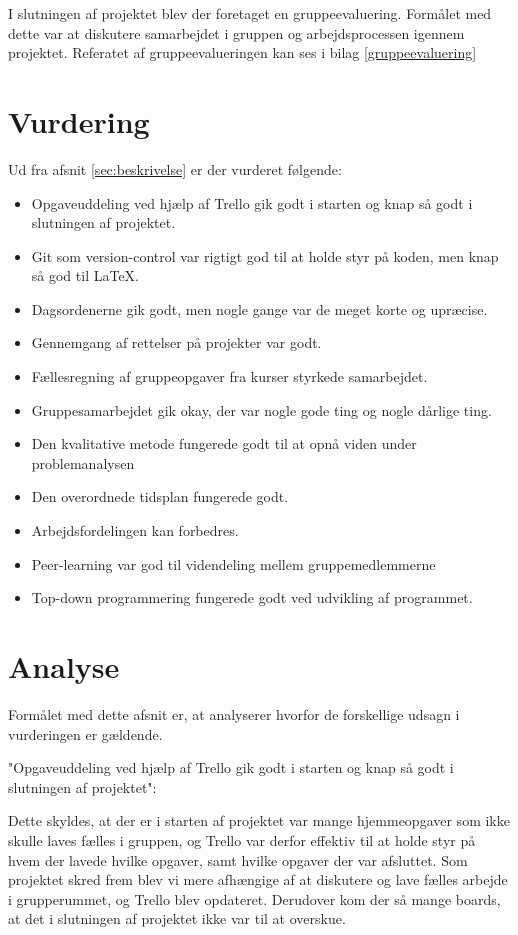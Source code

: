 I slutningen af projektet blev der foretaget en gruppeevaluering. Formålet med dette var at diskutere samarbejdet i gruppen og arbejdsprocessen igennem projektet. Referatet af gruppeevalueringen kan ses i bilag \ref{gruppeevaluering}

\section{Vurdering}
Ud fra afsnit \ref{sec:beskrivelse} er der vurderet følgende:
\begin{itemize}
  \item Opgaveuddeling ved hjælp af Trello gik godt i starten og knap så godt i slutningen af projektet.
  \item Git som version-control var rigtigt god til at holde styr på koden, men knap så god til LaTeX.
  \item Dagsordenerne gik godt, men nogle gange var de meget korte og upræcise.
  \item Gennemgang af rettelser på projekter var godt.
  \item Fællesregning af gruppeopgaver fra kurser styrkede samarbejdet.
  \item Gruppesamarbejdet gik okay, der var nogle gode ting og nogle dårlige ting. 
  \item Den kvalitative metode fungerede godt til at opnå viden under problemanalysen
  \item Den overordnede tidsplan fungerede godt.
  \item Arbejdsfordelingen kan forbedres.
  \item Peer-learning var god til videndeling mellem gruppemedlemmerne
  \item Top-down programmering fungerede godt ved udvikling af programmet.
\end{itemize}

\section{Analyse}
Formålet med dette afsnit er, at analyserer hvorfor de forskellige udsagn i vurderingen er gældende.

"Opgaveuddeling ved hjælp af Trello gik godt i starten og knap så godt i slutningen af projektet":

Dette skyldes, at der er i starten af projektet var mange hjemmeopgaver som ikke skulle laves fælles i gruppen, og Trello var derfor effektiv til at holde styr på hvem der lavede hvilke opgaver, samt hvilke opgaver der var afsluttet. Som projektet skred frem blev vi mere afhængige af at diskutere og lave fælles arbejde i grupperummet, og Trello blev opdateret. Derudover kom der så mange boards, at det i slutningen af projektet ikke var til at overskue.

